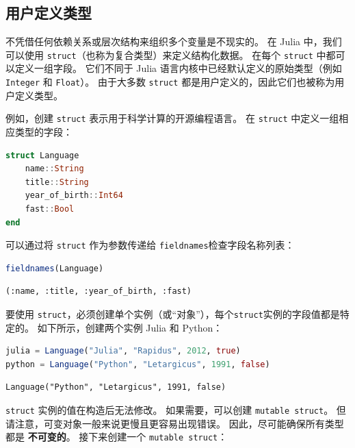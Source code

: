 \documentclass[
  notoc %
]{tufte-book}
\newcommand{\passthrough}[1]{#1}
\begin{document}
\hypertarget{sec:struct}{%
\subsection{用户定义类型}\label{sec:struct}}

不凭借任何依赖关系或层次结构来组织多个变量是不现实的。 在 Julia
中，我们可以使用
\passthrough{\lstinline!struct!}（也称为复合类型）来定义结构化数据。
在每个 \passthrough{\lstinline!struct!} 中都可以定义一组字段。
它们不同于 Julia 语言内核中已经默认定义的原始类型（例如
\passthrough{\lstinline!Integer!} 和 \passthrough{\lstinline!Float!}）。
由于大多数 \passthrough{\lstinline!struct!}
都是用户定义的，因此它们也被称为用户定义类型。

例如，创建 \passthrough{\lstinline!struct!}
表示用于科学计算的开源编程语言。 在 \passthrough{\lstinline!struct!}
中定义一组相应类型的字段：

\begin{lstlisting}[language=Julia]
struct Language
    name::String
    title::String
    year_of_birth::Int64
    fast::Bool
end
\end{lstlisting}

可以通过将 \passthrough{\lstinline!struct!} 作为参数传递给
\passthrough{\lstinline!fieldnames!}检查字段名称列表：

\begin{lstlisting}[language=Julia]
fieldnames(Language)
\end{lstlisting}

\begin{lstlisting}[language=Output]
(:name, :title, :year_of_birth, :fast)
\end{lstlisting}

要使用
\passthrough{\lstinline!struct!}，必须创建单个实例（或``对象''），每个\passthrough{\lstinline!struct!}实例的字段值都是特定的。
如下所示，创建两个实例 Julia 和 Python：

\begin{lstlisting}[language=Julia]
julia = Language("Julia", "Rapidus", 2012, true)
python = Language("Python", "Letargicus", 1991, false)
\end{lstlisting}

\begin{lstlisting}[language=Output]
Language("Python", "Letargicus", 1991, false)
\end{lstlisting}

\passthrough{\lstinline!struct!} 实例的值在构造后无法修改。
如果需要，可以创建 \passthrough{\lstinline!mutable struct!}。
但请注意，可变对象一般来说更慢且更容易出现错误。
因此，尽可能确保所有类型都是 \textbf{不可变的}。 接下来创建一个
\passthrough{\lstinline!mutable struct!}：
\end{document}
